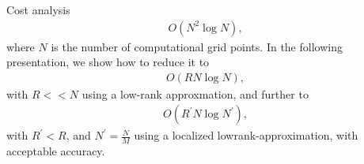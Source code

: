 \documentclass[aspectratio=169]{beamer}
\begin{document}
\begin{frame}{Cost analysis}
\begin{eqnarray*}
O(N^2\log N),
\end{eqnarray*}
where $N$ is the number of computational grid points. In the following presentation, we show how to reduce it to
\begin{eqnarray*}
 O(RN\log N),
\end{eqnarray*}
with $R<<N$ using a low-rank approxmation, and further to 
\begin{eqnarray*}
O(R^\prime N \log N^\prime),
\end{eqnarray*}
with $R^\prime<R$, and $N^\prime=\frac{N}{M}$ using a localized lowrank-approximation, with acceptable accuracy.
\end{frame}
\end{document}
